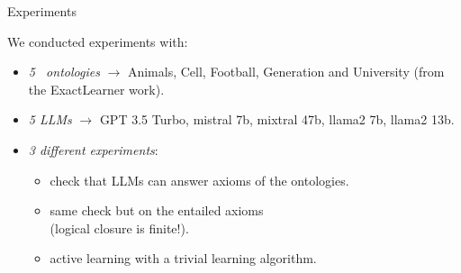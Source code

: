 \documentclass[presentation]{beamer}\mode<presentation>{\usetheme{blackAMSBolognaFC}}
\begin{document}
\begin{frame}[c]{Experiments}


    We conducted experiments with:
    \vfill
    \begin{itemize}
        \item \emph{5 \EL~ontologies} $\rightarrow$ Animals, Cell, Football, Generation and University (from the ExactLearner work).
        \vfill
        \item \emph{5 LLMs} $\rightarrow$ GPT 3.5 Turbo, mistral 7b, mixtral 47b, llama2 7b, llama2 13b.
        \vfill
        \item \emph{3 different experiments}:
        \begin{itemize}
            \item \quad check that LLMs can answer axioms of the ontologies.
            \item \quad same check but on the entailed axioms
            \\\quad (logical closure is finite!).
            \item \quad active learning with a trivial learning algorithm.
        \end{itemize}
        \vfill
    \end{itemize}

\end{frame}
\end{document}
